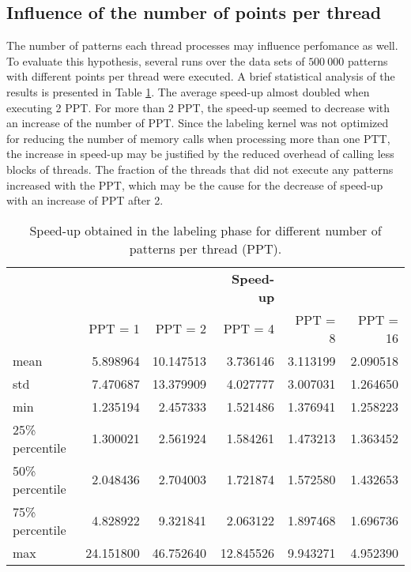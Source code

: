\subsection{Influence of the number of points per thread}

The number of patterns each thread processes may influence perfomance as well.
To evaluate this hypothesis, several runs over the data sets of $500 \: 000$ patterns with different points per thread were executed.
A brief statistical analysis of the results is presented in Table \ref{tab:kmeans cuda ppt}.
The average speed-up almost doubled when executing 2 PPT.
For more than 2 PPT, the speed-up seemed to decrease with an increase of the number of PPT.
Since the labeling kernel was not optimized for reducing the number of memory calls when processing more than one PTT, the increase in speed-up may be justified by the reduced overhead of calling less blocks of threads.
The fraction of the threads that did not execute any patterns increased with the PPT, which may be the cause for the decrease of speed-up with an increase of PPT after 2.

\begin{table}[h]
\centering
\caption{Speed-up obtained in the labeling phase for different number of patterns per thread (PPT).}


\begin{tabular}{lrrrrr}
\toprule
{} &       {} 	   &   {} 		   &  \textbf{Speed-up}  & {} 		& {}\\
{} &       PPT = 1 &       PPT = 2 &       PPT = 4 &       PPT = 8 &      PPT = 16 \\
\midrule
mean  &   5.898964 &  10.147513 &   3.736146 &   3.113199 &   2.090518 \\
std   &   7.470687 &  13.379909 &   4.027777 &   3.007031 &   1.264650 \\
min   &   1.235194 &   2.457333 &   1.521486 &   1.376941 &   1.258223 \\
25\% percentile  &   1.300021 &   2.561924 &   1.584261 &   1.473213 &   1.363452 \\
50\% percentile  &   2.048436 &   2.704003 &   1.721874 &   1.572580 &   1.432653 \\
75\% percentile  &   4.828922 &   9.321841 &   2.063122 &   1.897468 &   1.696736 \\
max   &  24.151800 &  46.752640 &  12.845526 &   9.943271 &   4.952390 \\
\bottomrule
\end{tabular}

\label{tab:kmeans cuda ppt}
\end{table}